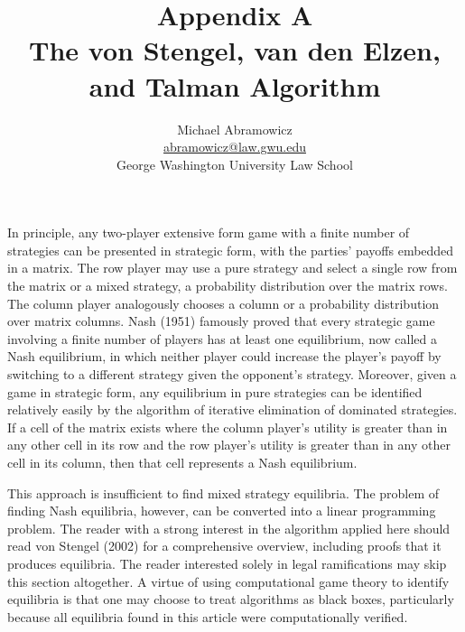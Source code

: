 \documentclass{article}
\begin{document}
\title{Appendix A \\ The von Stengel, van den Elzen, and Talman Algorithm}
\author{Michael Abramowicz \\ \href{mailto:abramowicz@law.gwu.edu}{abramowicz@law.gwu.edu} \\ George Washington University Law School}

\maketitle

In principle, any two-player extensive form game with a finite number of strategies can be presented in strategic form, with the parties' payoffs embedded in a matrix. The row player may use a pure strategy and select a single row from the matrix or a mixed strategy, a probability distribution over the matrix rows. The column player analogously chooses a column or a probability distribution over matrix columns. Nash (1951) famously proved that every strategic game involving a finite number of players has at least one equilibrium, now called a Nash equilibrium, in which neither player could increase the player's payoff by switching to a different strategy given the opponent's strategy. Moreover, given a game in strategic form, any equilibrium in pure strategies can be identified relatively easily by the algorithm of iterative elimination of dominated strategies. If a cell of the matrix exists where the column player's utility is greater than in any other cell in its row and the row player's utility is greater than in any other cell in its column, then that cell represents a Nash equilibrium. 

This approach is insufficient to find mixed strategy equilibria. The problem of finding Nash equilibria, however, can be converted into a linear programming problem. The reader with a strong interest in the algorithm applied here should read von Stengel (2002) for a comprehensive overview, including proofs that it produces equilibria. The reader interested solely in legal ramifications may skip this section altogether. A virtue of using computational game theory to identify equilibria is that one may choose to treat algorithms as black boxes, particularly because all equilibria found in this article were computationally verified.
\end{document}
